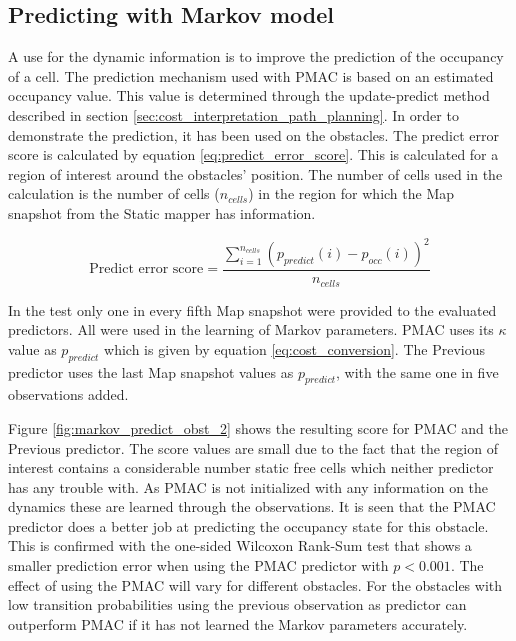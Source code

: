 
\subsection{Predicting with Markov model}

A use for the dynamic information is to improve the prediction of the occupancy of a cell. The prediction mechanism used with PMAC is based on an estimated occupancy value. This value is determined through the update-predict method described in section \vref{sec:cost_interpretation_path_planning}. 
In order to demonstrate the prediction, it has been used on the obstacles. The predict error score is calculated by equation \ref{eq:predict_error_score}. This is calculated for a region of interest around the obstacles' position. The number of cells used in the calculation is the number of cells ($n_{cells}$) in the region for which the Map snapshot from the Static mapper has information. 

\begin{equation}
	\text{Predict error score} = \frac{\sum\limits_{i=1}^{n_{cells}} (p_{predict}(i)-p_{occ}(i))^2}{n_{cells}}
	\label{eq:predict_error_score}
\end{equation} 

In the test only one in every fifth Map snapshot were provided to the evaluated predictors.
All were used in the learning of Markov parameters.
PMAC uses its $\kappa$ value as $p_{predict}$ which is given by equation \vref{eq:cost_conversion}. 
The Previous predictor uses the last Map snapshot values as $p_{predict}$, with the same one in five observations added.

Figure \ref{fig:markov_predict_obst_2} shows the resulting score for PMAC and the Previous predictor. 
The score values are small due to the fact that the region of interest contains a considerable number static free cells which neither predictor has any trouble with. 
As PMAC is not initialized with any information on the dynamics these are learned through the observations. 
It is seen that the PMAC predictor does a better job at predicting the occupancy state for this obstacle. 
This is confirmed with the one-sided Wilcoxon Rank-Sum test that shows a smaller prediction error when using the PMAC predictor with $p<0.001$.
The effect of using the PMAC will vary for different obstacles. For the obstacles with low transition probabilities using the previous observation as predictor can outperform PMAC if it has not learned the Markov parameters accurately. 

